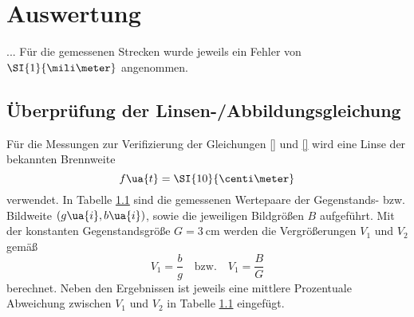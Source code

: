 \section{Auswertung}
...
Für die gemessenen Strecken wurde jeweils ein Fehler von $\SI{1}{\mili\meter}$ angenommen.

\subsection{Überprüfung der Linsen-/Abbildungsgleichung}
Für die Messungen zur Verifizierung der Gleichungen \eqref{} und \eqref{} wird eine Linse
der bekannten Brennweite
\begin{equation}
  f\ua{t} = \SI{10}{\centi\meter}
\end{equation}
verwendet. In Tabelle \ref{} sind die gemessenen Wertepaare der Gegenstands- bzw. Bildweite $(g\ua{i}, b\ua{i})$,
sowie die jeweiligen Bildgrößen $B$ aufgeführt. Mit der konstanten Gegenstandsgröße $G = \SI{3}{\centi\meter}$
werden die Vergrößerungen $V_1$ und $V_2$ gemäß
\begin{equation}
  V_1 = \frac{b}{g} \quad \text{bzw.} \quad V_1 = \frac{B}{G}
\end{equation}
berechnet. Neben den Ergebnissen ist jeweils eine mittlere Prozentuale Abweichung zwischen $V_1$ und $V_2$ in Tabelle \ref{}
eingefügt.

